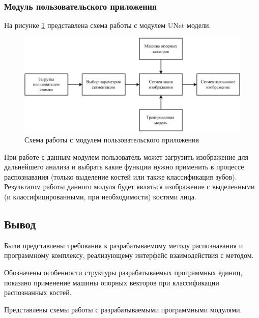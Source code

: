 \subsubsection{Модуль пользовательского приложения}

На рисунке \ref{fig:appuser} представлена схема работы с модулем UNet модели.

\begin{figure}[H]
	\centering
	\includegraphics[width=\textwidth]{img/appuser.pdf}
	\caption{Схема работы с модулем пользовательского приложения}
	\label{fig:appuser}
\end{figure}

При работе с данным модулем пользователь может загрузить изображение для дальнейшего анализа и выбрать какие функции нужно применить в процессе распознавания (только выделение костей или также классификация зубов). Результатом работы данного модуля будет являться изображение с выделенными (и классифицированными, при необходимости) костями лица.

\subsection*{Вывод}

Были представлены требования к разрабатываемому методу распознавания и программному комплексу, реализующему интерфейс взаимодействия с методом.

Обозначены особенности структуры разрабатываемых программных единиц, показано применение машины опорных векторов при классификации распознанных костей.

Представлены схемы работы с разрабатываемыми программными модулями.